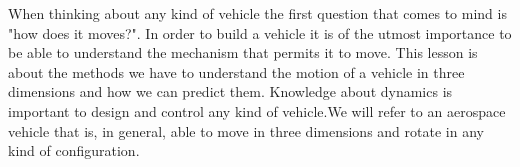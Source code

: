When thinking about any kind of vehicle the first question that comes to mind is "how does it moves?". In order to build a vehicle it is of the utmost importance to be able to understand the mechanism that permits it to move. This lesson is about the methods we have to understand the motion of a vehicle in three dimensions and how we can predict them. Knowledge about dynamics is important to design and control any kind of vehicle.We will refer to an aerospace vehicle that is, in general, able to move in three dimensions and rotate in any kind of configuration. 
